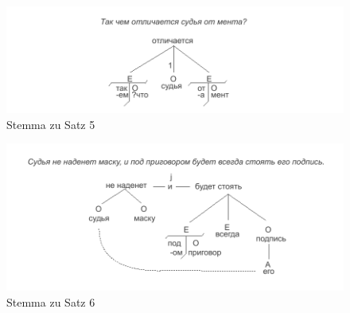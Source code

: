 \begin{figure}
    \begin{center}
        \includegraphics{anhang_a/stemma5}
        \caption{Stemma zu Satz 5}
        \label{fig:stemma5}
    \end{center}
\end{figure}

\begin{figure}
    \begin{center}
        \includegraphics{anhang_a/stemma6}
        \caption{Stemma zu Satz 6}
        \label{fig:stemma6}
    \end{center}
\end{figure}

